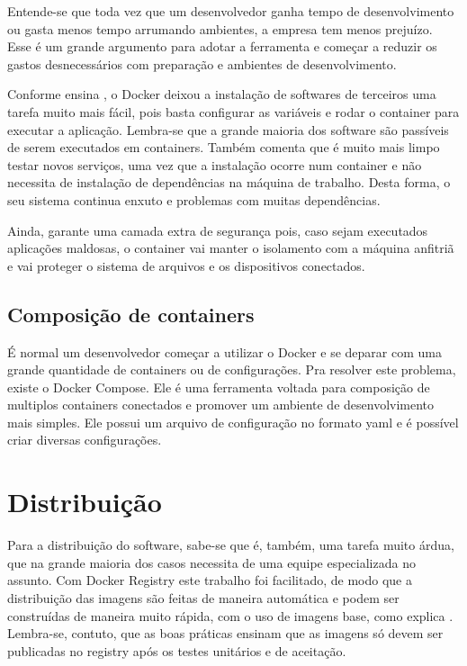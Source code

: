 \documentclass[
	12pt,				%
	openright,			%
	oneside,			%
	a4paper,			%
	chapter=TITLE,		%
	section=TITLE,		%
	english,			%
	french,				%
	spanish,			%
	brazil				%
	]{abntex2}
\begin{document}
Entende-se que toda vez que um desenvolvedor ganha tempo de desenvolvimento ou gasta menos tempo arrumando ambientes, a empresa tem menos prejuízo. Esse é um grande argumento para adotar a ferramenta e começar a reduzir os gastos desnecessários com preparação e ambientes de desenvolvimento.

Conforme ensina , o Docker deixou a instalação de softwares de terceiros uma tarefa muito mais fácil, pois basta configurar as variáveis e rodar o container para executar a aplicação. Lembra-se que a grande maioria dos software são passíveis de serem executados em containers. Também comenta que é muito mais limpo testar novos serviços, uma vez que a instalação ocorre num container e não necessita de instalação de dependências na máquina de trabalho. Desta forma, o seu sistema continua enxuto e problemas com muitas dependências.

Ainda, garante uma camada extra de segurança pois, caso sejam executados aplicações maldosas, o container vai manter o isolamento com a máquina anfitriã e vai proteger o sistema de arquivos e os dispositivos conectados.

\subsection{Composição de containers}

É normal um desenvolvedor começar a utilizar o Docker e se deparar com uma grande quantidade de containers ou de configurações. Pra resolver este problema, existe o Docker Compose. Ele é uma ferramenta voltada para composição de multiplos containers conectados e promover um ambiente de desenvolvimento mais simples. Ele possui um arquivo de configuração no formato yaml e é possível criar diversas configurações.

\section{Distribuição}

Para a distribuição do software, sabe-se que é, também, uma tarefa muito árdua, que na grande maioria dos casos necessita de uma equipe especializada no assunto. Com Docker Registry este trabalho foi facilitado, de modo que a distribuição das imagens são feitas de maneira automática e podem ser construídas de maneira muito rápida, com o uso de imagens base, como explica . Lembra-se, contuto, que as boas práticas ensinam que as imagens só devem ser publicadas no registry após os testes unitários e de aceitação.
\end{document}
